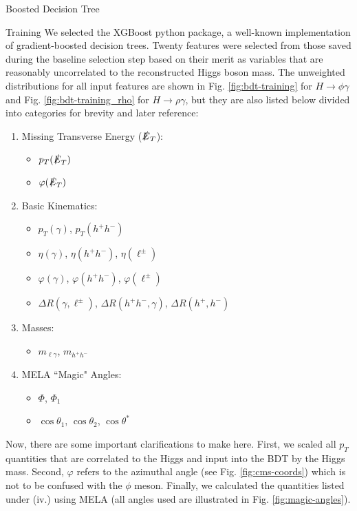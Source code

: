 \begin{section}{Boosted Decision Tree}
\begin{subsection}{Training}
We selected the XGBoost python package, a well-known implementation of gradient-boosted decision trees. Twenty features were selected from those saved during the baseline selection step based on their merit as variables that are reasonably uncorrelated to the reconstructed Higgs boson mass. The unweighted distributions for all input features are shown in Fig. \ref{fig:bdt-training} for $H\rightarrow\phi\gamma$ and Fig. \ref{fig:bdt-training_rho} for $H\rightarrow\rho\gamma$, but they are also listed below divided into categories for brevity and later reference:
\begin{enumerate}[(i.)]
    \item Missing Transverse Energy ($\slashed{E}_{T}$):
    \begin{itemize}
        \item $p_{T}(\slashed{E}_{T})$
        \item $\varphi(\slashed{E}_{T})$
    \end{itemize}
    \item Basic Kinematics:
    \begin{itemize}
        \item $p_{T}(\gamma)$, $p_{T}(h^{+}h^{-})$
        \item $\eta(\gamma)$, $\eta(h^{+}h^{-})$, $\eta(\ell^{\pm})$
        \item $\varphi(\gamma)$, $\varphi(h^{+}h^{-})$, $\varphi(\ell^{\pm})$
        \item $\Delta R(\gamma, \ell^{\pm})$, $\Delta R(h^{+}h^{-}, \gamma)$, $\Delta R(h^{+}, h^{-})$
    \end{itemize}
    \item Masses:
    \begin{itemize}
        \item $m_{\ell\gamma}$, $m_{h^{+}h^{-}}$
    \end{itemize}
    \item MELA ``Magic" Angles:
    \begin{itemize}
        \item $\Phi$, $\Phi_{1}$
        \item $\cos\theta_{1}$, $\cos\theta_{2}$, $\cos\theta^{*}$
    \end{itemize}
\end{enumerate}

\noindent Now, there are some important clarifications to make here. First, we scaled all $p_{T}$ quantities that are correlated to the Higgs and input into the BDT by the Higgs mass. Second, $\varphi$ refers to the azimuthal angle (see Fig. \ref{fig:cms-coords}) which is not to be confused with the $\phi$ meson. Finally, we calculated the quantities listed under (iv.) using MELA\cite{cite-mela} (all angles used are illustrated in Fig. \ref{fig:magic-angles}).


\end{subsection}
\end{section}
